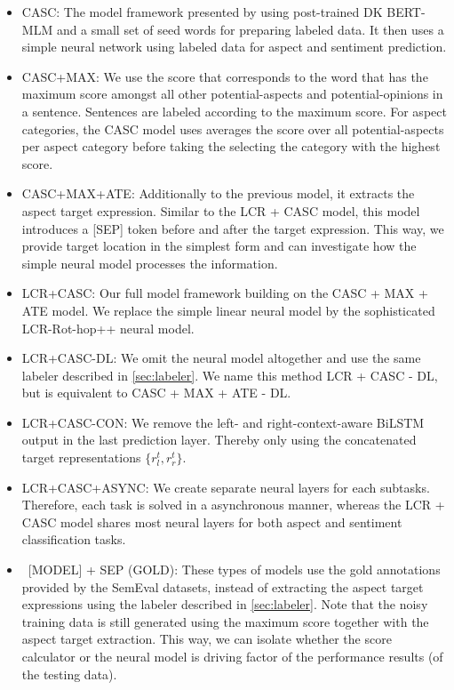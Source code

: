 \documentclass[american, oneside]{ecsgdp}
\begin{document}
\begin{itemize}
    \item CASC: The model framework presented by \textcite{Kumar2021CASC} using post-trained DK BERT-MLM and a small set of seed words for preparing labeled data. It then uses a simple neural network using labeled data for aspect and sentiment prediction.
    \item CASC+MAX: We use the score that corresponds to the word that has the maximum score amongst all other potential-aspects and potential-opinions in a sentence. Sentences are labeled according to the maximum score. For aspect categories, the CASC model uses averages the score over all potential-aspects per aspect category before taking the selecting the category with the highest score. 
    \item CASC+MAX+ATE: Additionally to the previous model, it extracts the aspect target expression. Similar to the LCR + CASC model, this model introduces a [SEP] token before and after the target expression. This way, we provide target location in the simplest form and can investigate how the simple neural model processes the information.
    \item LCR+CASC: Our full model framework building on the CASC + MAX + ATE model. We replace the simple linear neural model by the sophisticated LCR-Rot-hop++ neural model.
    \item LCR+CASC-DL: We omit the neural model altogether and use the same labeler described in \cref{sec:labeler}. We name this method LCR + CASC - DL, but is equivalent to CASC + MAX + ATE - DL.
    \item LCR+CASC-CON: We remove the left- and right-context-aware BiLSTM output in the last prediction layer. Thereby only using the concatenated target representations $\{r^t_l, r^t_r\}$.
    \item LCR+CASC+ASYNC: We create separate neural layers for each subtasks. Therefore, each task is solved in a asynchronous manner, whereas the LCR + CASC model shares most neural layers for both aspect and sentiment classification tasks.
    \item \ [MODEL] + SEP (GOLD): These types of models use the gold annotations provided by the SemEval datasets, instead of extracting the aspect target expressions using the labeler described in \cref{sec:labeler}. Note that the noisy training data is still generated using the maximum score together with the aspect target extraction. This way, we can isolate whether the score calculator or the neural model is driving factor of the performance results (of the testing data).
\end{itemize}
\end{document}
